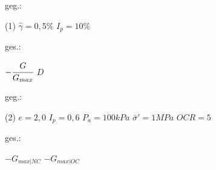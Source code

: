 \documentclass[12pt]{exam}
\begin{document}
\begin{questions}
  \vspace{1em}
 
     \begin{minipage}[t]{.49\linewidth}
    geg.:
    \begin{tasks}(1)
      \task[] $\hat\gamma = 0,5\%$
      \task[] $I_p = 10 \%$
    \end{tasks}
    \end{minipage}
    \begin{minipage}[t]{.49\linewidth}
    ges.:
        \begin{tasks}
            \task $-\cfrac{G}{G_{max}}$
            \task $D$
        \end{tasks}
    \end{minipage}
    
    \begin{center}\end{center}

\vspace{1cm}

  \vspace{1em}
 
     \begin{minipage}[t]{.49\linewidth}
    geg.:
    \begin{tasks}(2)
      \task[] $e = 2,0$
    \task[] $I_p = 0,6$
    \task[] $P_a = 100 kPa$
    \task[] $\bar \sigma' = 1 MPa$
    \task[] $OCR = 5$
    \end{tasks}
    \end{minipage}
    \begin{minipage}[t]{.49\linewidth}
    ges.:
        \begin{tasks}
            \task $- G_{max|NC}$
            \task $- G_{max|OC}$
        \end{tasks}
    \end{minipage}
 \begin{center}\end{center}


\end{questions}
\end{document}
